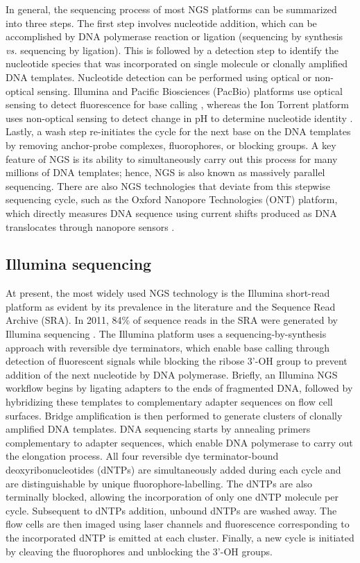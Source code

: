 In general, the sequencing process of most NGS platforms can be summarized into three steps. The first step involves nucleotide addition, which can be accomplished by DNA polymerase reaction or ligation (sequencing by synthesis \textit{vs.} sequencing by ligation). This is followed by a detection step to identify the nucleotide species that was incorporated on single molecule or clonally amplified DNA templates. Nucleotide detection can be performed using optical or non-optical sensing. Illumina and Pacific Biosciences (PacBio) platforms use optical sensing to detect fluorescence for base calling \cite{}, whereas the Ion Torrent platform uses non-optical sensing to detect change in pH to determine nucleotide identity \cite{}. Lastly, a wash step re-initiates the cycle for the next base on the DNA templates by removing anchor-probe complexes, fluorophores, or blocking groups. A key feature of NGS is its ability to simultaneously carry out this process for many millions of DNA templates; hence, NGS is also known as massively parallel sequencing. There are also NGS technologies that deviate from this stepwise sequencing cycle, such as the Oxford Nanopore Technologies (ONT) platform, which directly measures DNA sequence using current shifts produced as DNA translocates through nanopore sensors \cite{}.


\subsection{Illumina sequencing}

At present, the most widely used NGS technology is the Illumina short-read platform as evident by its prevalence in the literature and the Sequence Read Archive (SRA). In 2011, 84\% of sequence reads in the SRA were generated by Illumina sequencing \cite{Kodama2012}. The Illumina platform uses a sequencing-by-synthesis approach with reversible dye terminators, which enable base calling through detection of fluorescent signals while blocking the ribose 3'-OH group to prevent addition of the next nucleotide by DNA polymerase. Briefly, an Illumina NGS workflow begins by ligating adapters to the ends of fragmented DNA, followed by hybridizing these templates to complementary adapter sequences on flow cell surfaces. Bridge amplification is then performed to generate clusters of clonally amplified DNA templates. DNA sequencing starts by annealing primers complementary to adapter sequences, which enable DNA polymerase to carry out the elongation process. All four reversible dye terminator-bound deoxyribonucleotides (dNTPs) are simultaneously added during each cycle and are distinguishable by unique fluorophore-labelling. The dNTPs are also terminally blocked, allowing the incorporation of only one dNTP molecule per cycle. Subsequent to dNTPs addition, unbound dNTPs are washed away. The flow cells are then imaged using laser channels and fluorescence corresponding to the incorporated dNTP is emitted at each cluster. Finally, a new cycle is initiated by cleaving the fluorophores and unblocking the 3'-OH groups.


